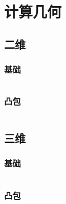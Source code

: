 \chapter{计算几何}
\section{二维}
\subsection{基础}
\inputminted{cpp}{\source/computational-geometry/2d/basis.cpp}
\subsection{凸包}
\inputminted{cpp}{\source/computational-geometry/2d/convex.cpp}
\section{三维}
\subsection{基础}
\inputminted{cpp}{\source/computational-geometry/3d/basis.cpp}
\subsection{凸包}
\inputminted{cpp}{\source/computational-geometry/3d/convex.cpp}
